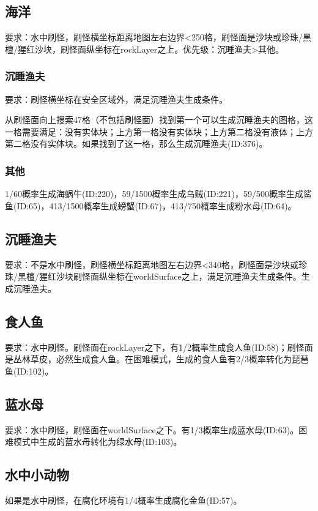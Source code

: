\subsection{海洋}
要求：水中刷怪，刷怪横坐标距离地图左右边界<250格，刷怪面是沙块或珍珠/黑檀/猩红沙块，刷怪面纵坐标在rockLayer之上。优先级：沉睡渔夫>其他。

\subsubsection{沉睡渔夫}
要求：刷怪横坐标在安全区域外，满足沉睡渔夫生成条件。

从刷怪面向上搜索47格（不包括刷怪面）找到第一个可以生成沉睡渔夫的图格，这一格需要满足：没有实体块；上方第一格没有实体块；上方第二格没有液体；上方第二格没有实体块。如果找到了这一格，那么生成沉睡渔夫(ID:376)。

\subsubsection{其他}
1/60概率生成海蜗牛(ID:220)，59/1500概率生成乌贼(ID:221)，59/500概率生成鲨鱼(ID:65)，413/1500概率生成螃蟹(ID:67)，413/750概率生成粉水母(ID:64)。

\subsection{沉睡渔夫}
要求：不是水中刷怪，刷怪横坐标距离地图左右边界<340格，刷怪面是沙块或珍珠/黑檀/猩红沙块刷怪面纵坐标在worldSurface之上，满足沉睡渔夫生成条件。生成沉睡渔夫。

\subsection{食人鱼}
要求：水中刷怪。刷怪面在rockLayer之下，有1/2概率生成食人鱼(ID:58)；刷怪面是丛林草皮，必然生成食人鱼。在困难模式，生成的食人鱼有2/3概率转化为琵琶鱼(ID:102)。

\subsection{蓝水母}
要求：水中刷怪，刷怪面在worldSurface之下。有1/3概率生成蓝水母(ID:63)。困难模式中生成的蓝水母转化为绿水母(ID:103)。

\subsection{水中小动物}
如果是水中刷怪，在腐化环境有1/4概率生成腐化金鱼(ID:57)。

